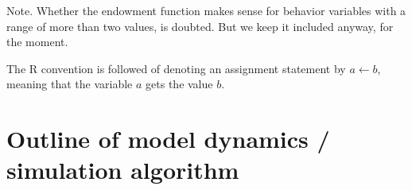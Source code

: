 \documentclass[a4paper,12pt,fleqn]{article}
\newcommand{\R}{{\sf R }}
\begin{document}

Note. Whether the endowment function makes sense for behavior variables with a range
of more than two values, is doubted. But we keep it included anyway, for the moment.
\medskip

The \R convention is followed of denoting an assignment statement by $a \leftarrow b$,
meaning that the variable $a$ gets the value $b$.


\section{Outline of model dynamics / simulation algorithm}
\label{S_sim}
\end{document}
